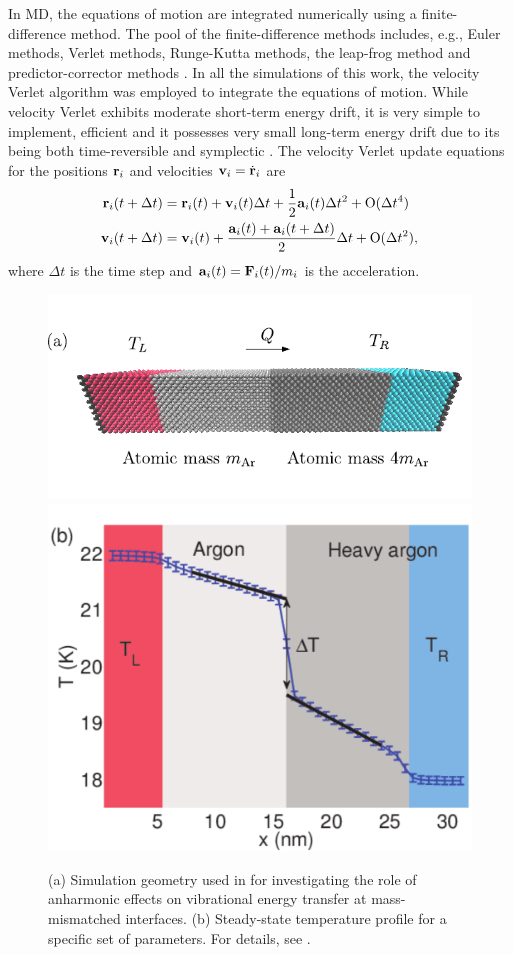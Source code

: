 
In MD, the equations of motion are integrated numerically using a finite-difference method. The pool of the finite-difference methods includes, e.g., Euler methods, Verlet methods, Runge-Kutta methods, the leap-frog method and predictor-corrector methods \cite{allentildesley}. In all the simulations of this work, the velocity Verlet algorithm was employed to integrate the equations of motion. While velocity Verlet exhibits moderate short-term energy drift, it is very simple to implement, efficient and it possesses very small long-term energy drift due to its being both time-reversible and symplectic \cite{frenkelsmit}. The velocity Verlet update equations for the positions $\mathbf{r}_i$ and velocities $\mathbf{v}_i=\dot{\mathbf{r}}_i$ are \cite{allentildesley}
\begin{alignat}{2}
  \mathbf{r}_i(t+\Delta t) &= \mathbf{r}_i(t) + \mathbf{v}_i(t)\Delta t+  \frac{1}{2}\mathbf{a}_i(t) \Delta t^2 + \mathrm{O}(\Delta t^4) \\
  \mathbf{v}_i(t+\Delta t) &= \mathbf{v}_i(t) + \frac{ \mathbf{a}_i(t)+\mathbf{a}_i(t+\Delta t)}{2} \Delta t+ \mathrm{O}(\Delta t^2) ,
\end{alignat}
where $\Delta t$ is the time step and $\mathbf{a}_i(t)=\mathbf{F}_i(t)/m_i$ is the acceleration.

\begin{figure}[tb]
 \begin{center}
  \includegraphics[width=.59\columnwidth]{pics/nemd_fig2a_2.pdf} 
  \includegraphics[width=.59\columnwidth]{pics/nemd_fig2b_2.pdf}
  \caption{(a) Simulation geometry used in  for investigating the role of anharmonic effects on vibrational energy transfer at mass-mismatched interfaces. (b) Steady-state temperature profile for a specific set of parameters. For details, see .}  
\label{fig:th_spectral_geom}
 \end{center}
\end{figure}


